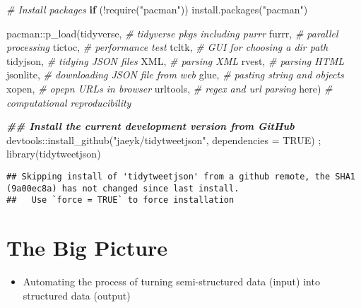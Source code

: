 \documentclass[
]{book}
\newenvironment{Shaded}{\begin{snugshade}}{\end{snugshade}}
\newcommand{\AttributeTok}[1]{\textcolor[rgb]{0.77,0.63,0.00}{#1}}
\newcommand{\CommentTok}[1]{\textcolor[rgb]{0.56,0.35,0.01}{\textit{#1}}}
\newcommand{\ConstantTok}[1]{\textcolor[rgb]{0.00,0.00,0.00}{#1}}
\newcommand{\ControlFlowTok}[1]{\textcolor[rgb]{0.13,0.29,0.53}{\textbf{#1}}}
\newcommand{\DocumentationTok}[1]{\textcolor[rgb]{0.56,0.35,0.01}{\textbf{\textit{#1}}}}
\newcommand{\FunctionTok}[1]{\textcolor[rgb]{0.00,0.00,0.00}{#1}}
\newcommand{\NormalTok}[1]{#1}
\newcommand{\SpecialCharTok}[1]{\textcolor[rgb]{0.00,0.00,0.00}{#1}}
\newcommand{\StringTok}[1]{\textcolor[rgb]{0.31,0.60,0.02}{#1}}
\providecommand{\tightlist}{%
  \setlength{\itemsep}{0pt}\setlength{\parskip}{0pt}}
\begin{document}
\begin{Shaded}
\begin{Highlighting}[]
\CommentTok{\# Install packages }
\ControlFlowTok{if}\NormalTok{ (}\SpecialCharTok{!}\FunctionTok{require}\NormalTok{(}\StringTok{"pacman"}\NormalTok{)) }\FunctionTok{install.packages}\NormalTok{(}\StringTok{"pacman"}\NormalTok{)}

\NormalTok{pacman}\SpecialCharTok{::}\FunctionTok{p\_load}\NormalTok{(tidyverse, }\CommentTok{\# tidyverse pkgs including purrr}
\NormalTok{               furrr, }\CommentTok{\# parallel processing }
\NormalTok{               tictoc, }\CommentTok{\# performance test  }
\NormalTok{               tcltk, }\CommentTok{\# GUI for choosing a dir path }
\NormalTok{               tidyjson, }\CommentTok{\# tidying JSON files }
\NormalTok{               XML, }\CommentTok{\# parsing XML}
\NormalTok{               rvest, }\CommentTok{\# parsing HTML}
\NormalTok{               jsonlite, }\CommentTok{\# downloading JSON file from web}
\NormalTok{               glue, }\CommentTok{\# pasting string and objects}
\NormalTok{               xopen, }\CommentTok{\# opepn URLs in browser }
\NormalTok{               urltools, }\CommentTok{\# regex and url parsing }
\NormalTok{               here) }\CommentTok{\# computational reproducibility}

\DocumentationTok{\#\# Install the current development version from GitHub}
\NormalTok{devtools}\SpecialCharTok{::}\FunctionTok{install\_github}\NormalTok{(}\StringTok{"jaeyk/tidytweetjson"}\NormalTok{, }\AttributeTok{dependencies =} \ConstantTok{TRUE}\NormalTok{) ; }\FunctionTok{library}\NormalTok{(tidytweetjson)}
\end{Highlighting}
\end{Shaded}

\begin{verbatim}
## Skipping install of 'tidytweetjson' from a github remote, the SHA1 (9a00ec8a) has not changed since last install.
##   Use `force = TRUE` to force installation
\end{verbatim}

\hypertarget{the-big-picture-8}{%
\section{The Big Picture}\label{the-big-picture-8}}

\begin{itemize}
\tightlist
\item
  Automating the process of turning semi-structured data (input) into structured data (output)
\end{itemize}
\end{document}
